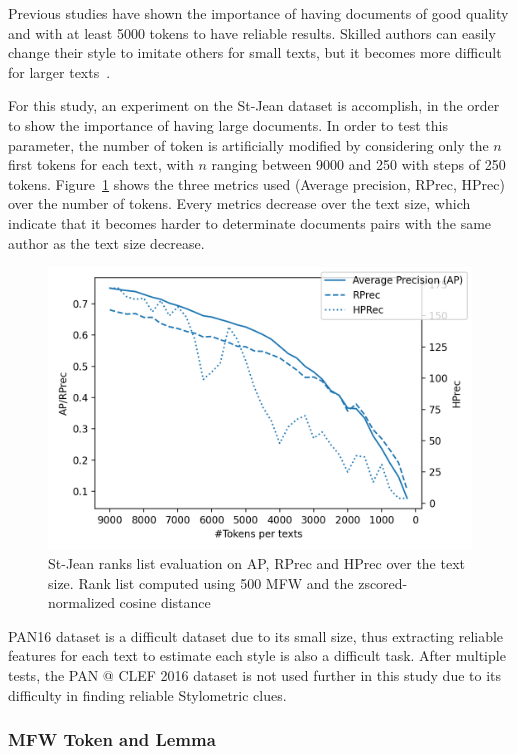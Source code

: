 Previous studies have shown the importance of having documents of good quality and with at least 5000 tokens to have reliable results.
Skilled authors can easily change their style to imitate others for small texts, but it becomes more difficult for larger texts~\cite{savoy_stylo}.

For this study, an experiment on the St-Jean dataset is accomplish, in the order to show the importance of having large documents.
In order to test this parameter, the number of token is artificially modified by considering only the $n$ first tokens for each text, with $n$ ranging between 9000 and 250 with steps of 250 tokens.
Figure~\ref{img:degradation} shows the three metrics used (Average precision, RPrec, HPrec) over the number of tokens.
Every metrics decrease over the text size, which indicate that it becomes harder to determinate documents pairs with the same author as the text size decrease.

\begin{figure}
  \centering
  \includegraphics[width=\linewidth]{img/degradation.png}
  \caption{St-Jean ranks list evaluation on AP, RPrec and HPrec over the text size. Rank list computed using 500 MFW and the zscored-normalized cosine distance}
  \label{img:degradation}
\end{figure}

PAN16 dataset is a difficult dataset due to its small size, thus extracting reliable features for each text to estimate each style is also a difficult task.
After multiple tests, the PAN @ CLEF 2016 dataset is not used further in this study due to its difficulty in finding reliable Stylometric clues.

\subsubsection{MFW Token and Lemma}
\label{sec:mfw_token_lemma}

